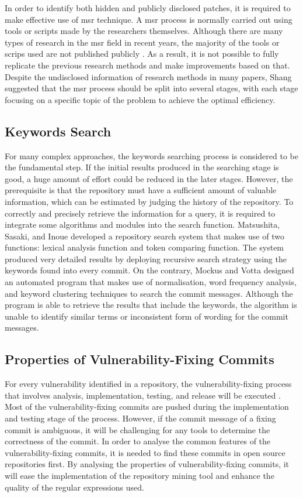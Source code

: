 \documentclass[12pt, a4paper]{report}
\begin{document}
In order to identify both hidden and publicly disclosed patches, it is required to make effective
use of \acrshort{msr} technique. A \acrshort{msr} process is normally carried out using tools or
scripts made by the researchers themselves. Although there are many types of research in the
\acrshort{msr} field in recent years, the majority of the tools or scrips used are not published
publicly \cite{robles_2010}. As a result, it is not possible to fully replicate the previous
research methods and make improvements based on that. Despite the undisclosed information of
research methods in many papers, Shang \cite{shang_2009} suggested that the \acrshort{msr} process
should be split into several stages, with each stage focusing on a specific topic of the problem to
achieve the optimal efficiency.

\subsection{Keywords Search}
For many complex approaches, the keywords searching process is considered to be the fundamental
step. If the initial results produced in the searching stage is good, a huge amount of effort could
be reduced in the later stages. However, the prerequisite is that the repository must have a
sufficient amount of valuable information, which can be estimated by judging the history of the
repository. To correctly and precisely retrieve the information for a query, it is required to
integrate some algorithms and modules into the search function. Matsushita, Sasaki, and Inoue
\cite{matsushita_2005} developed a repository search system that makes use of two functions: lexical
analysis function and token comparing function. The system produced very detailed results by
deploying recursive search strategy using the keywords found into every commit. On the contrary,
Mockus and Votta \cite{mockus_2000} designed an automated program that makes use of normalisation,
word frequency analysis, and keyword clustering techniques to search the commit messages. Although
the program is able to retrieve the results that include the keywords, the algorithm is unable to
identify similar terms or inconsistent form of wording for the commit messages.

\subsection{Properties of Vulnerability-Fixing Commits}
For every vulnerability identified in a repository, the vulnerability-fixing process that involves
analysis, implementation, testing, and release will be executed \cite{othmane_2015}. Most of the
vulnerability-fixing commits are pushed during the implementation and testing stage of the process.
However, if the commit message of a fixing commit is ambiguous, it will be challenging for any tools
to determine the correctness of the commit. In order to analyse the common features of the
vulnerability-fixing commits, it is needed to find these commits in open source repositories first.
By analysing the properties of vulnerability-fixing commits, it will ease the implementation of the
repository mining tool and enhance the quality of the regular expressions used.
\end{document}

